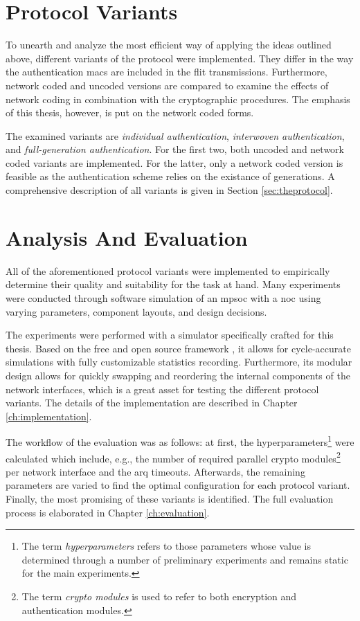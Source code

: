 \section{Protocol Variants}\label{sec:protocolvariants}
To unearth and analyze the most efficient way of applying the ideas outlined above, different variants of the protocol were implemented. They differ
in the way the authentication \glspl{mac} are included in the flit transmissions. Furthermore, network coded and uncoded versions are compared to
examine the effects of network coding in combination with the cryptographic procedures. The emphasis of this thesis, however, is put on the network
coded forms.

The examined variants are \textit{individual authentication}, \textit{interwoven authentication}, and \textit{full-generation authentication}. For the
first two, both uncoded and network coded variants are implemented. For the latter, only a network coded version is feasible as the authentication
scheme relies on the existance of generations. A comprehensive description of all variants is given in Section \ref{sec:theprotocol}.

\section{Analysis And Evaluation}
All of the aforementioned protocol variants were implemented to empirically determine their quality and suitability for the task at hand. Many
experiments were conducted through software simulation of an \gls{mpsoc} with a \gls{noc} using varying parameters, component layouts, and design
decisions.

The experiments were performed with a simulator specifically crafted for this thesis. Based on the free and open source framework \textit{\omnet{}}
\cite{omnet}, it allows for cycle-accurate simulations with fully customizable statistics recording. Furthermore, its modular design allows for
quickly swapping and reordering the internal components of the network interfaces, which is a great asset for testing the different protocol variants.
The details of the implementation are described in Chapter \ref{ch:implementation}.

The workflow of the evaluation was as follows: at first, the hyperparameters\footnote{The term \textit{hyperparameters} refers to those parameters
whose value is determined through a number of preliminary experiments and remains static for the main experiments.} were
calculated which include, e.g., the number of required parallel crypto modules\footnote{The term \textit{crypto modules} is
used to refer to both encryption and authentication modules.} per network interface and the \gls{arq} timeouts. Afterwards, the remaining parameters are
varied to find the optimal configuration for each protocol variant. Finally, the most promising of these variants is identified. The full evaluation
process is elaborated in Chapter \ref{ch:evaluation}.

